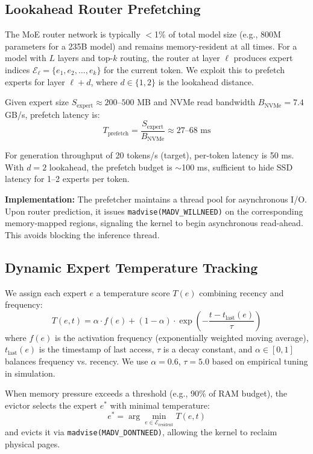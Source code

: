 \documentclass[11pt]{article}
\begin{document}
\subsection{Lookahead Router Prefetching}

The MoE router network is typically $<$1\% of total model size (e.g., 800M parameters for a 235B model) and remains memory-resident at all times. For a model with $L$ layers and top-$k$ routing, the router at layer $\ell$ produces expert indices $\mathcal{E}_\ell = \{e_1, e_2, \ldots, e_k\}$ for the current token. We exploit this to prefetch experts for layer $\ell + d$, where $d \in \{1, 2\}$ is the lookahead distance.

Given expert size $S_{\text{expert}} \approx 200\text{--}500$ MB and NVMe read bandwidth $B_{\text{NVMe}} = 7.4$ GB/s, prefetch latency is:
\begin{equation}
    T_{\text{prefetch}} = \frac{S_{\text{expert}}}{B_{\text{NVMe}}} \approx 27\text{--}68\text{ ms}
\end{equation}

For generation throughput of 20 tokens/s (target), per-token latency is 50 ms. With $d=2$ lookahead, the prefetch budget is $\sim$100 ms, sufficient to hide SSD latency for 1--2 experts per token.

\textbf{Implementation:} The prefetcher maintains a thread pool for asynchronous I/O. Upon router prediction, it issues \texttt{madvise(MADV\_WILLNEED)} on the corresponding memory-mapped regions, signaling the kernel to begin asynchronous read-ahead. This avoids blocking the inference thread.

\subsection{Dynamic Expert Temperature Tracking}

We assign each expert $e$ a temperature score $T(e)$ combining recency and frequency:
\begin{equation}
    T(e, t) = \alpha \cdot f(e) + (1-\alpha) \cdot \exp\left(-\frac{t - t_{\text{last}}(e)}{\tau}\right)
\end{equation}
where $f(e)$ is the activation frequency (exponentially weighted moving average), $t_{\text{last}}(e)$ is the timestamp of last access, $\tau$ is a decay constant, and $\alpha \in [0,1]$ balances frequency vs. recency. We use $\alpha = 0.6$, $\tau = 5.0$ based on empirical tuning in simulation.

When memory pressure exceeds a threshold (e.g., 90\% of RAM budget), the evictor selects the expert $e^*$ with minimal temperature:
\begin{equation}
    e^* = \arg\min_{e \in \mathcal{E}_{\text{resident}}} T(e, t)
\end{equation}
and evicts it via \texttt{madvise(MADV\_DONTNEED)}, allowing the kernel to reclaim physical pages.
\end{document}
